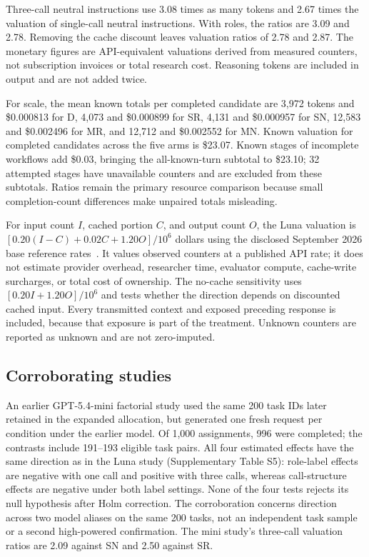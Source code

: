 \documentclass[pdflatex,sn-nature]{scientificreports}
\begin{document}
Three-call neutral instructions use 3.08 times as many tokens and 2.67 times the valuation of single-call neutral instructions. With roles, the ratios are 3.09 and 2.78. Removing the cache discount leaves valuation ratios of 2.78 and 2.87. The monetary figures are API-equivalent valuations derived from measured counters, not subscription invoices or total research cost. Reasoning tokens are included in output and are not added twice.

For scale, the mean known totals per completed candidate are 3,972 tokens and \$0.000813 for D, 4,073 and \$0.000899 for SR, 4,131 and \$0.000957 for SN, 12,583 and \$0.002496 for MR, and 12,712 and \$0.002552 for MN. Known valuation for completed candidates across the five arms is \$23.07. Known stages of incomplete workflows add \$0.03, bringing the all-known-turn subtotal to \$23.10; 32 attempted stages have unavailable counters and are excluded from these subtotals. Ratios remain the primary resource comparison because small completion-count differences make unpaired totals misleading.

For input count $I$, cached portion $C$, and output count $O$, the Luna valuation is $[0.20(I-C)+0.02C+1.20O]/10^6$ dollars using the disclosed September 2026 base reference rates~\cite{openai56luna2026,openaipricing2026}. It values observed counters at a published API rate; it does not estimate provider overhead, researcher time, evaluator compute, cache-write surcharges, or total cost of ownership. The no-cache sensitivity uses $[0.20I+1.20O]/10^6$ and tests whether the direction depends on discounted cached input. Every transmitted context and exposed preceding response is included, because that exposure is part of the treatment. Unknown counters are reported as unknown and are not zero-imputed.




\subsection{Corroborating studies}
An earlier GPT-5.4-mini factorial study used the same 200 task IDs later retained in the expanded allocation, but generated one fresh request per condition under the earlier model. Of 1,000 assignments, 996 were completed; the contrasts include 191--193 eligible task pairs. All four estimated effects have the same direction as in the Luna study (Supplementary Table S5): role-label effects are negative with one call and positive with three calls, whereas call-structure effects are negative under both label settings. None of the four tests rejects its null hypothesis after Holm correction. The corroboration concerns direction across two model aliases on the same 200 tasks, not an independent task sample or a second high-powered confirmation. The mini study's three-call valuation ratios are 2.09 against SN and 2.50 against SR.
\end{document}
